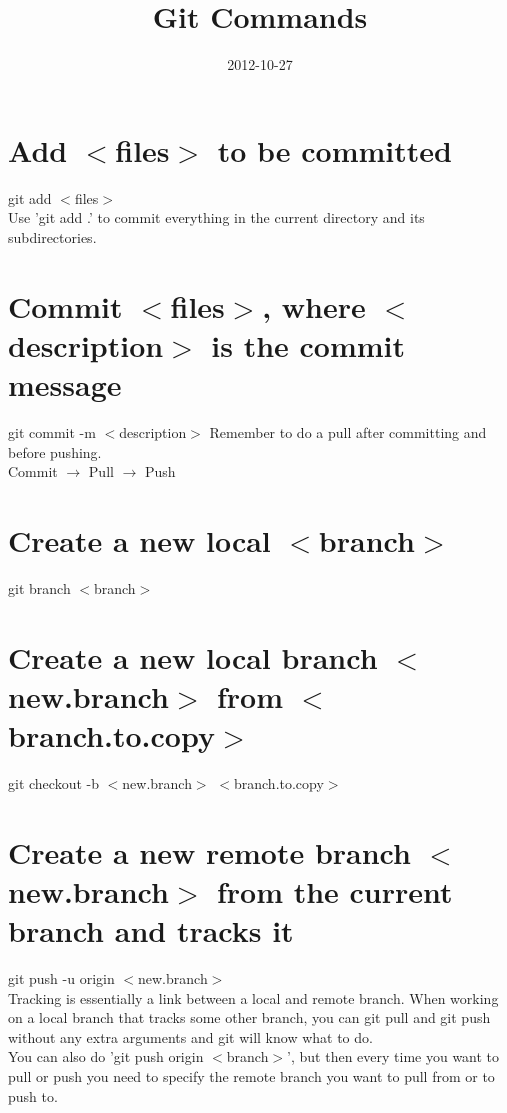 \documentclass[]{article}
\title{Git Commands}
\author{  }
\date{2012-10-27}
\begin{document}
\ifpdf
{}
\else
{}
\fi

\maketitle



\section{Add $<$files$>$ to be committed}
git add $<$files$>$\\
Use 'git add .' to commit everything in the current directory and its subdirectories.

\section{Commit $<$files$>$, where $<$description$>$ is the commit message}
git commit -m $<$description$>$
Remember to do a pull after committing and before pushing.\\
Commit $\rightarrow$ Pull $\rightarrow$ Push

\section{Create a new local $<$branch$>$}
git branch $<$branch$>$

\section{Create a new local branch $<$new.branch$>$ from $<$branch.to.copy$>$}
git checkout -b $<$new.branch$>$ $<$branch.to.copy$>$

\section{Create a new remote branch $<$new.branch$>$ from the current branch and tracks it}
git push -u origin $<$new.branch$>$\\
Tracking is essentially a link between a local and remote branch. When working on a local branch that tracks some other branch, you can git pull and git push without any extra arguments and git will know what to do.\\
You can also do 'git push origin $<$branch$>$', but then every time you want to pull or push you need to specify the remote branch you want to pull from or to push to.
\end{document}
